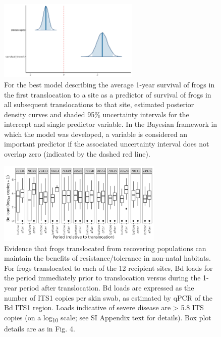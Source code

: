 \documentclass[9pt,twoside,lineno]{pnas-new}
\begin{document}
\begin{figure}

{\centering \includegraphics[width=0.60\textwidth]{figures/mcmc_areas_m2b.png}

}

\caption{\label{fig-transsurvival-postdens}For the best model describing
the average 1-year survival of frogs in the first translocation to a
site as a predictor of survival of frogs in all subsequent
translocations to that site, estimated posterior density curves and
shaded 95\% uncertainty intervals for the intercept and single predictor
variable. In the Bayesian framework in which the model was developed, a
variable is considered an important predictor if the associated
uncertainty interval does not overlap zero (indicated by the dashed red
line).}

\end{figure}\clearpage

\begin{figure}

{\centering \includegraphics[width=0.7\textwidth]{figures/bdload_beforeafter.png}

}

\caption{\label{fig-bdload-beforeafter}Evidence that frogs translocated
from recovering populations can maintain the benefits of
resistance/tolerance in non-natal habitats. For frogs translocated to
each of the 12 recipient sites, Bd loads for the period immediately
prior to translocation versus during the 1-year period after
translocation. Bd loads are expressed as the number of ITS1 copies per
skin swab, as estimated by qPCR of the Bd ITS1 region. Loads indicative
of severe disease are \textgreater{} 5.8 ITS copies (on a
log\textsubscript{10} scale; see SI Appendix text for details). Box plot
details are as in Fig. 4.}

\end{figure}\clearpage
\end{document}
